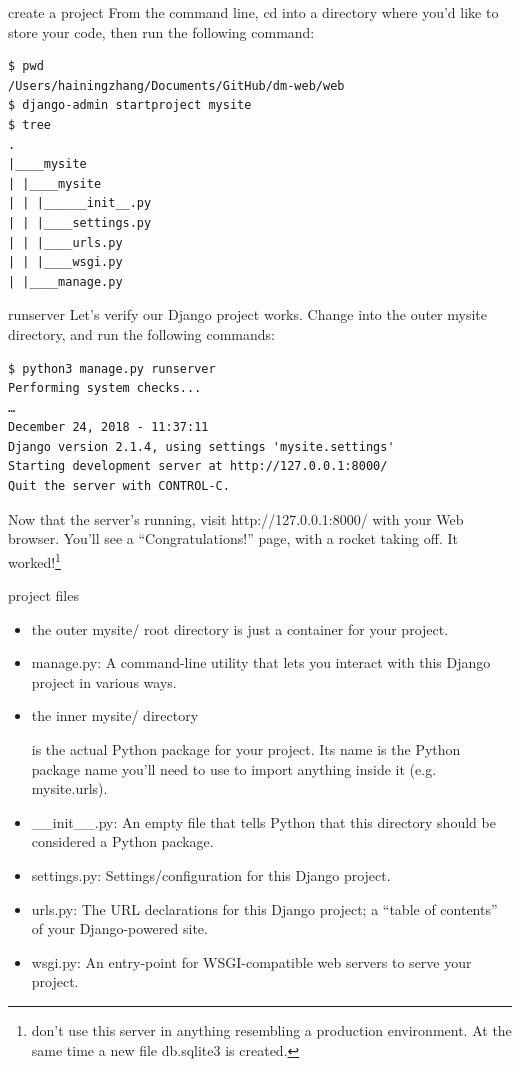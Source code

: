 \documentclass{beamer}
\begin{document}
\begin{frame}[fragile]{create a project}
From the command line, cd into a directory where you’d like to store your code, then run the following command:
\begin{verbatim}
$ pwd
/Users/hainingzhang/Documents/GitHub/dm-web/web
$ django-admin startproject mysite
$ tree
.
|____mysite
| |____mysite
| | |______init__.py
| | |____settings.py
| | |____urls.py
| | |____wsgi.py
| |____manage.py

\end{verbatim}
\end{frame}
\begin{frame}[fragile]{runserver}
Let’s verify our Django project works. Change into the outer mysite directory, and run the following commands:
\begin{verbatim}
$ python3 manage.py runserver
Performing system checks...
…
December 24, 2018 - 11:37:11
Django version 2.1.4, using settings 'mysite.settings'
Starting development server at http://127.0.0.1:8000/
Quit the server with CONTROL-C.
\end{verbatim}
Now that the server’s running, visit http://127.0.0.1:8000/ with your Web browser. You’ll see a “Congratulations!” page, with a rocket taking off. It worked!\footnote{don’t use this server in anything resembling a production environment. At the same time a new file db.sqlite3 is created.}
\end{frame}
\begin{frame}{project files}
\begin{itemize}
\item the outer mysite/ root directory is just a container for your project. 
\item manage.py: A command-line utility that lets you interact with this Django project in various ways. 
\item the inner mysite/ directory

 is the actual Python package for your project. Its name is the Python package name you’ll need to use to import anything inside it (e.g. mysite.urls).
\item \_\_init\_\_.py: An empty file that tells Python that this directory should be considered a Python package. 
\item settings.py: Settings/configuration for this Django project. 
\item urls.py: The URL declarations for this Django project; a “table of contents” of your Django-powered site. 
\item wsgi.py: An entry-point for WSGI-compatible web servers to serve your project. 
\end{itemize}
\end{frame}
\end{document}
